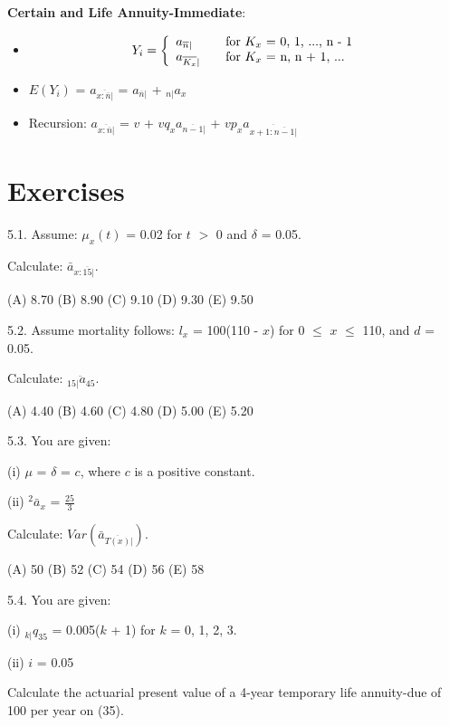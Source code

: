 \documentclass[]{book}
\begin{document}
\textbf{Certain and Life Annuity-Immediate}:

\begin{itemize}
\item
  \[Y_i = \left\{
    \begin{array}{l l}
      a_{\overline{n}|}               & \quad \text{for $K_x$ = 0, 1, ..., n - 1}\\
      a_{\overline{K_x}|}         & \quad \text{for $K_x$ = n, n + 1, ...}\\
    \end{array} \right.\]
\item
  \(E(Y_i)\) = \(a_{\overline{x: \overline{n}|}}\) =
  \(a_{\overline{n}|}\) + \({}_{n|}a_x\)
\item
  Recursion: \(a_{\overline{x: \overline{n}|}}\) = \(v\) +
  \(vq_xa_{\overline{n - 1}|}\) +
  \(vp_x a_{\overline{x + 1: \overline{n - 1}|}}\)
\end{itemize}

\section{Exercises}\label{exercises-2}

5.1. Assume: \(\mu_x(t)\) = 0.02 for \(t\) \(>\) 0 and \(\delta\) =
0.05.

Calculate: \(\bar{a}_{x:\overline{15}|}\).

(A) 8.70 (B) 8.90 (C) 9.10 (D) 9.30 (E) 9.50

5.2. Assume mortality follows: \(l_x\) = 100(110 - \(x\)) for 0 \(\le\)
\(x\) \(\le\) 110, and \(d\) = 0.05.

Calculate: \({}_{15|}\ddot{a}_{45}\).

(A) 4.40 (B) 4.60 (C) 4.80 (D) 5.00 (E) 5.20

5.3. You are given:

(i) \(\mu\) = \(\delta\) = \(c\), where \(c\) is a positive constant.

(ii) \(^2\bar{a}_x\) = \(\frac{25}{3}\)

Calculate: \(Var(\bar{a}_{\overline{T(x)}|})\).

(A) 50 (B) 52 (C) 54 (D) 56 (E) 58

5.4. You are given:

(i) \({}_{k|}q_{35}\) = 0.005(\(k\) + 1) for \(k\) = 0, 1, 2, 3.

(ii) \(i\) = 0.05

Calculate the actuarial present value of a 4-year temporary life
annuity-due of 100 per year on (35).
\end{document}
